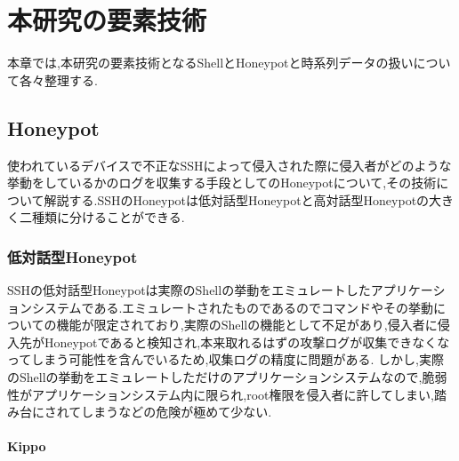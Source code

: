 \chapter{本研究の要素技術}
\label{tech}

本章では,本研究の要素技術となるShellとHoneypotと時系列データの扱いについて各々整理する.

\section{Honeypot}

使われているデバイスで不正なSSHによって侵入された際に侵入者がどのような挙動をしているかのログを収集する手段としてのHoneypotについて,その技術について解説する.SSHのHoneypot\cite{honeypot}は低対話型Honeypotと高対話型Honeypotの大きく二種類に分けることができる.\\


\subsection{低対話型Honeypot}
\label{tech:LowInteractionHoneypot}

SSHの低対話型Honeypotは実際のShellの挙動をエミュレートしたアプリケーションシステムである.エミュレートされたものであるのでコマンドやその挙動についての機能が限定されており,実際のShellの機能として不足があり,侵入者に侵入先がHoneypotであると検知され,本来取れるはずの攻撃ログが収集できなくなってしまう可能性を含んでいるため,収集ログの精度に問題がある.
しかし,実際のShellの挙動をエミュレートしただけのアプリケーションシステムなので,脆弱性がアプリケーションシステム内に限られ,root権限を侵入者に許してしまい,踏み台にされてしまうなどの危険が極めて少ない.

\subsubsection{Kippo}
\label{tech:Kippo}

